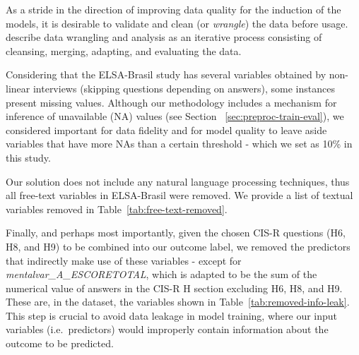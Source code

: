 As a stride in the direction of improving data quality for the induction of the models, it is desirable to validate and clean (or \textit{wrangle}) the data before usage.
~\citet{Kandel2011} describe data wrangling and analysis as an iterative process consisting of cleansing, merging, adapting, and evaluating the data.

Considering that the ELSA-Brasil study has several variables obtained by non-linear interviews (skipping questions depending on answers), some instances present missing values.
Although our methodology includes a mechanism for inference of unavailable (NA) values (see Section ~\ref{sec:preproc-train-eval}), we considered important for data fidelity and for model quality to leave aside variables that have more NAs than a certain threshold - which we set as 10\% in this study.

Our solution does not include any natural language processing techniques, thus all free-text variables in ELSA-Brasil were removed.
We provide a list of textual variables removed in Table~\ref{tab:free-text-removed}.

Finally, and perhaps most importantly, given the chosen CIS-R questions (H6, H8, and H9) to be combined into our outcome label, we removed the predictors that indirectly make use of these variables - except for \textit{mentalvar\_A\_ESCORETOTAL}, which is adapted to be the sum of the numerical value of answers in the CIS-R H section excluding H6, H8, and H9.
These are, in the dataset, the variables shown in Table~\ref{tab:removed-info-leak}.
This step is crucial to avoid data leakage in model training, where our input variables (i.e.\ predictors) would improperly contain information about the outcome to be predicted.

